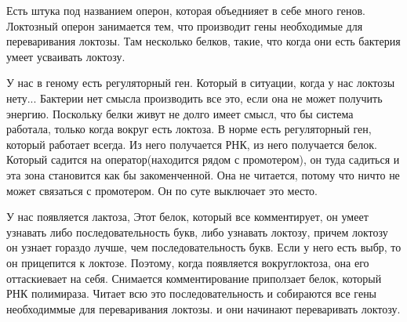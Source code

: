 Есть штука под названием оперон, которая объеднияет в себе много
генов. Локтозный оперон занимается тем, что производит гены необходимые
для переваривания локтозы. Там несколько белков,
такие, что когда они есть бактерия
умеет усваивать локтозу.

У нас в геному есть регуляторный ген. Который в ситуации, когда у нас
локтозы нету... Бактерии нет смысла производить все это, если
она не может получить энергию. Поскольку белки живут не долго
имеет смысл, что бы система работала, только
когда вокруг есть локтоза. В норме есть регуляторный ген,
который работает всегда. Из него получается
РНК, из него получается белок. Который садится на оператор(находится рядом с промотером),
он туда садиться и эта зона становится как бы закоменченной. Она
не читается, потому что ничто не может связаться с промотером. Он
по суте выключает это место.

У нас появляется лактоза, Этот белок, который все комментирует,
он умеет узнавать либо последовательность букв, либо узнавать локтозу,
причем локтозу он узнает гораздо лучше, чем последовательность букв.
Если у него есть выбр, то он прицепится к локтозе. Поэтому, когда
появляется вокруглоктоза, она его оттаскиевает на себя. Снимается комментирование
приползает белок, который РНК полимираза. Читает всю это последовательность и
собираются все гены необходиммые для переваривания локтозы. и они начинают переваривать локтозу.  
    
